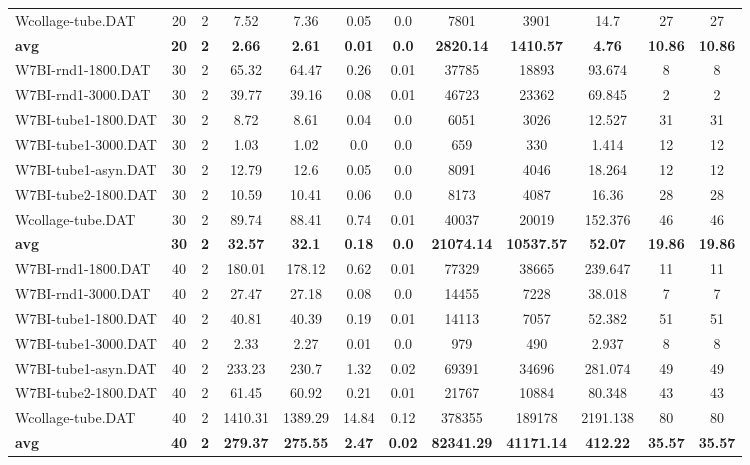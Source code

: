\begin{table}[!h]
{\begin{tabular}{lccccccccccc}
Wcollage-tube.DAT & 20 & 2 & 7.52 & 7.36 & 0.05 & 0.0 & 7801 & 3901 & 14.7 & 27 & 27\\
\cline{1-12} \textbf{avg} & \textbf{20} & \textbf{2} & \textbf{2.66} & \textbf{2.61} & \textbf{0.01} & \textbf{0.0} & \textbf{2820.14} & \textbf{1410.57} & \textbf{4.76} & \textbf{10.86} & \textbf{10.86} \\ \cline{1-12}
W7BI-rnd1-1800.DAT & 30 & 2 & 65.32 & 64.47 & 0.26 & 0.01 & 37785 & 18893 & 93.674 & 8 & 8\\
W7BI-rnd1-3000.DAT & 30 & 2 & 39.77 & 39.16 & 0.08 & 0.01 & 46723 & 23362 & 69.845 & 2 & 2\\
W7BI-tube1-1800.DAT & 30 & 2 & 8.72 & 8.61 & 0.04 & 0.0 & 6051 & 3026 & 12.527 & 31 & 31\\
W7BI-tube1-3000.DAT & 30 & 2 & 1.03 & 1.02 & 0.0 & 0.0 & 659 & 330 & 1.414 & 12 & 12\\
W7BI-tube1-asyn.DAT & 30 & 2 & 12.79 & 12.6 & 0.05 & 0.0 & 8091 & 4046 & 18.264 & 12 & 12\\
W7BI-tube2-1800.DAT & 30 & 2 & 10.59 & 10.41 & 0.06 & 0.0 & 8173 & 4087 & 16.36 & 28 & 28\\
Wcollage-tube.DAT & 30 & 2 & 89.74 & 88.41 & 0.74 & 0.01 & 40037 & 20019 & 152.376 & 46 & 46\\
\cline{1-12} \textbf{avg} & \textbf{30} & \textbf{2} & \textbf{32.57} & \textbf{32.1} & \textbf{0.18} & \textbf{0.0} & \textbf{21074.14} & \textbf{10537.57} & \textbf{52.07} & \textbf{19.86} & \textbf{19.86} \\ \cline{1-12}
W7BI-rnd1-1800.DAT & 40 & 2 & 180.01 & 178.12 & 0.62 & 0.01 & 77329 & 38665 & 239.647 & 11 & 11\\
W7BI-rnd1-3000.DAT & 40 & 2 & 27.47 & 27.18 & 0.08 & 0.0 & 14455 & 7228 & 38.018 & 7 & 7\\
W7BI-tube1-1800.DAT & 40 & 2 & 40.81 & 40.39 & 0.19 & 0.01 & 14113 & 7057 & 52.382 & 51 & 51\\
W7BI-tube1-3000.DAT & 40 & 2 & 2.33 & 2.27 & 0.01 & 0.0 & 979 & 490 & 2.937 & 8 & 8\\
W7BI-tube1-asyn.DAT & 40 & 2 & 233.23 & 230.7 & 1.32 & 0.02 & 69391 & 34696 & 281.074 & 49 & 49\\
W7BI-tube2-1800.DAT & 40 & 2 & 61.45 & 60.92 & 0.21 & 0.01 & 21767 & 10884 & 80.348 & 43 & 43\\
Wcollage-tube.DAT & 40 & 2 & 1410.31 & 1389.29 & 14.84 & 0.12 & 378355 & 189178 & 2191.138 & 80 & 80\\
\cline{1-12} \textbf{avg} & \textbf{40} & \textbf{2} & \textbf{279.37} & \textbf{275.55} & \textbf{2.47} & \textbf{0.02} & \textbf{82341.29} & \textbf{41171.14} & \textbf{412.22} & \textbf{35.57} & \textbf{35.57} \\ \cline{1-12}

\end{tabular}}
\end{table}

